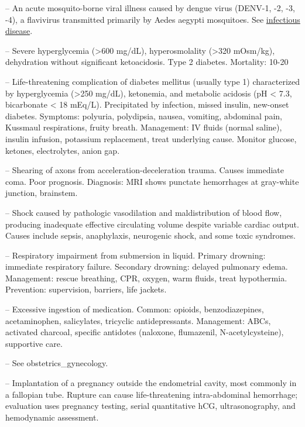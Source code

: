-- An acute mosquito-borne viral illness caused by dengue virus (DENV-1, -2, -3, -4), a flavivirus transmitted primarily by Aedes aegypti mosquitoes. See \hyperlink{Infectious Disease}{infectious disease}.

-- Severe hyperglycemia (>600 mg/dL), hyperosmolality (>320 mOsm/kg), dehydration without significant ketoacidosis. Type 2 diabetes. Mortality: 10-20%

-- Life-threatening complication of diabetes mellitus (usually type 1) characterized by hyperglycemia (>250 mg/dL), ketonemia, and metabolic acidosis (pH < 7.3, bicarbonate < 18 mEq/L). Precipitated by infection, missed insulin, new-onset diabetes. Symptoms: polyuria, polydipsia, nausea, vomiting, abdominal pain, Kussmaul respirations, fruity breath. Management: IV fluids (normal saline), insulin infusion, potassium replacement, treat underlying cause. Monitor glucose, ketones, electrolytes, anion gap.

-- Shearing of axons from acceleration-deceleration trauma. Causes immediate coma. Poor prognosis. Diagnosis: MRI shows punctate hemorrhages at gray-white junction, brainstem.

-- Shock caused by pathologic vasodilation and maldistribution of blood flow, producing inadequate effective circulating volume despite variable cardiac output. Causes include sepsis, anaphylaxis, neurogenic shock, and some toxic syndromes.

-- Respiratory impairment from submersion in liquid. Primary drowning: immediate respiratory failure. Secondary drowning: delayed pulmonary edema. Management: rescue breathing, CPR, oxygen, warm fluids, treat hypothermia. Prevention: supervision, barriers, life jackets.

-- Excessive ingestion of medication. Common: opioids, benzodiazepines, acetaminophen, salicylates, tricyclic antidepressants. Management: ABCs, activated charcoal, specific antidotes (naloxone, flumazenil, N-acetylcysteine), supportive care.

-- See obstetrics\_gynecology.

-- Implantation of a pregnancy outside the endometrial cavity, most commonly in a fallopian tube. Rupture can cause life-threatening intra-abdominal hemorrhage; evaluation uses pregnancy testing, serial quantitative hCG, ultrasonography, and hemodynamic assessment.

